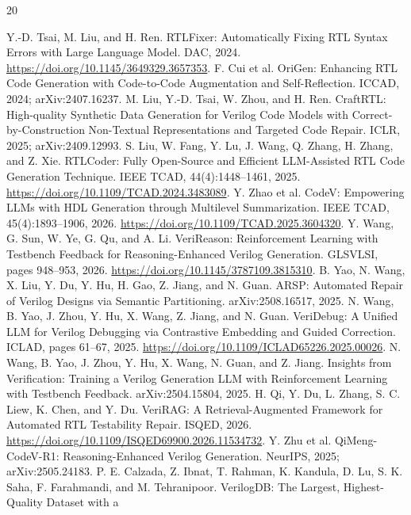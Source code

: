 \documentclass{article}
\begin{document}
\raggedbottom
\begin{thebibliography}{20}
\small
\raggedright
\setlength{\emergencystretch}{2em}
\setlength{\itemsep}{1pt}
\setlength{\parsep}{0pt}
 Y.-D. Tsai, M. Liu, and H. Ren. RTLFixer: Automatically Fixing RTL Syntax Errors
with Large Language Model. DAC, 2024. \url{https://doi.org/10.1145/3649329.3657353}.
 F. Cui et al. OriGen: Enhancing RTL Code Generation with Code-to-Code Augmentation
and Self-Reflection. ICCAD, 2024; arXiv:2407.16237.
 M. Liu, Y.-D. Tsai, W. Zhou, and H. Ren. CraftRTL: High-quality Synthetic Data
Generation for Verilog Code Models with Correct-by-Construction Non-Textual Representations and
Targeted Code Repair. ICLR, 2025; arXiv:2409.12993.
 S. Liu, W. Fang, Y. Lu, J. Wang, Q. Zhang, H. Zhang, and Z. Xie. RTLCoder: Fully
Open-Source and Efficient LLM-Assisted RTL Code Generation Technique. IEEE TCAD,
44(4):1448--1461, 2025. \url{https://doi.org/10.1109/TCAD.2024.3483089}.
 Y. Zhao et al. CodeV: Empowering LLMs with HDL Generation through Multilevel
Summarization. IEEE TCAD, 45(4):1893--1906, 2026. \url{https://doi.org/10.1109/TCAD.2025.3604320}.
 Y. Wang, G. Sun, W. Ye, G. Qu, and A. Li. VeriReason: Reinforcement Learning
with Testbench Feedback for Reasoning-Enhanced Verilog Generation. GLSVLSI, pages 948--953, 2026.
\url{https://doi.org/10.1145/3787109.3815310}.
 B. Yao, N. Wang, X. Liu, Y. Du, Y. Hu, H. Gao, Z. Jiang, and N. Guan. ARSP:
Automated Repair of Verilog Designs via Semantic Partitioning. arXiv:2508.16517, 2025.
 N. Wang, B. Yao, J. Zhou, Y. Hu, X. Wang, Z. Jiang, and N. Guan. VeriDebug: A
Unified LLM for Verilog Debugging via Contrastive Embedding and Guided Correction.
ICLAD, pages 61--67, 2025. \url{https://doi.org/10.1109/ICLAD65226.2025.00026}.
 N. Wang, B. Yao, J. Zhou, Y. Hu, X. Wang, N. Guan, and Z. Jiang. Insights
from Verification: Training a Verilog Generation LLM with Reinforcement Learning with Testbench
Feedback. arXiv:2504.15804, 2025.
 H. Qi, Y. Du, L. Zhang, S. C. Liew, K. Chen, and Y. Du. VeriRAG: A
Retrieval-Augmented Framework for Automated RTL Testability Repair. ISQED, 2026.
\url{https://doi.org/10.1109/ISQED69900.2026.11534732}.
 Y. Zhu et al. QiMeng-CodeV-R1: Reasoning-Enhanced Verilog Generation.
NeurIPS, 2025; arXiv:2505.24183.
 P. E. Calzada, Z. Ibnat, T. Rahman, K. Kandula, D. Lu, S. K. Saha,
F. Farahmandi, and M. Tehranipoor. VerilogDB: The Largest, Highest-Quality Dataset with a

\end{thebibliography}
\end{document}
